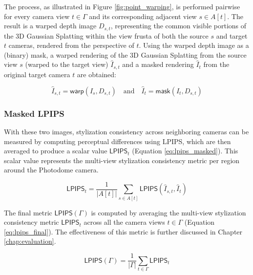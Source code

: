 \begin{enumerate}
\end{enumerate}

The process, as illustrated in Figure \ref{fig:point_warping}, is performed pairwise for every camera view $t \in \varGamma$ and its corresponding adjacent view $s \in A[t]$. The result is a warped depth image $D_{s,t}$, representing the common visible portions of the 3D Gaussian Splatting within the view frusta of both the source $s$ and target $t$ cameras, rendered from the perspective of $t$. Using the warped depth image as a (binary) mask, a warped rendering of the 3D Gaussian Splatting from the source view $s$ (warped to the target view) $\hat{I}_{s,t}$ and a masked rendering $\hat{I}_t$ from the original target camera $t$ are obtained:

\begin{equation}
	\label{eq:masked_rendering}
	\hat{I}_{s,t} = \mathsf{warp}(I_s, D_{s,t}) \quad \text{and} \quad \hat{I}_t = \mathsf{mask}(I_t, D_{s,t})
\end{equation}


\subsubsection{Masked LPIPS}
With these two images, stylization consistency across neighboring cameras can be measured by computing perceptual differences using LPIPS, which are then averaged to produce a scalar value $\mathsf{LPIPS}_{t}$ (Equation \ref{eq:lpips_masked}). This scalar value represents the multi-view stylization consistency metric per region around the Photodome camera.

\begin{equation}
	\label{eq:lpips_masked}
	\mathsf{LPIPS}_{t} = \frac{1}{\vert A[t] \vert} \sum_{s \in A[t]} \mathsf{LPIPS}(\hat{I}_{s,t}, \hat{I}_t)
\end{equation}

The final metric $\mathsf{LPIPS}(\varGamma )$ is computed by averaging the multi-view stylization consistency metric $\mathsf{LPIPS}_{t}$ across all the camera views $t \in \varGamma $ (Equation \ref{eq:lpips_final}). The effectiveness of this metric is further discussed in Chapter \ref{chap:evaluation}.

\begin{equation}
	\label{eq:lpips_final}
	\mathsf{LPIPS}(\varGamma ) = \frac{1}{\vert \varGamma  \vert} \sum_{t \in \varGamma } \mathsf{LPIPS}_{t}
\end{equation}


